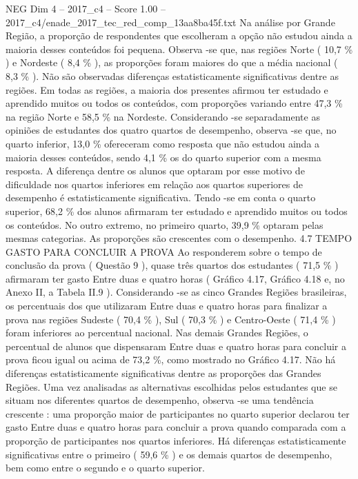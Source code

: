 \begin{textsample}{NEG Dim 4 – 2017\_c4 – Score 1.00 – 2017\_c4/enade\_2017\_tec\_red\_comp\_13aa8ba45f.txt}
Na análise por Grande Região, a proporção de respondentes que escolheram a opção não estudou ainda a maioria desses conteúdos foi pequena.
Observa -se que, nas regiões Norte ( 10,7 \% ) e Nordeste ( 8,4 \% ), as proporções foram maiores do que a média nacional ( 8,3 \% ).
Não são observadas diferenças estatisticamente significativas dentre as regiões.
Em todas as regiões, a maioria dos presentes afirmou ter estudado e aprendido muitos ou todos os conteúdos, com proporções variando entre 47,3 \% na região Norte e 58,5 \% na Nordeste.
Considerando -se separadamente as opiniões de estudantes dos quatro quartos de desempenho, observa -se que, no quarto inferior, 13,0 \% ofereceram como resposta que não estudou ainda a maioria desses conteúdos, sendo 4,1 \% os do quarto superior com a mesma resposta.
A diferença dentre os alunos que optaram por esse motivo de dificuldade nos quartos inferiores em relação aos quartos superiores de desempenho é estatisticamente significativa.
Tendo -se em conta o quarto superior, 68,2 \% dos alunos afirmaram ter estudado e aprendido muitos ou todos os conteúdos.
No outro extremo, no primeiro quarto, 39,9 \% optaram pelas mesmas categorias.
As proporções são crescentes com o desempenho. 4.7 TEMPO GASTO PARA CONCLUIR A PROVA Ao responderem sobre o tempo de conclusão da prova ( Questão 9 ), quase três quartos dos estudantes ( 71,5 \% ) afirmaram ter gasto Entre duas e quatro horas ( Gráfico 4.17, Gráfico 4.18 e, no Anexo II, a Tabela II.9 ).
Considerando -se as cinco Grandes Regiões brasileiras, os percentuais dos que utilizaram Entre duas e quatro horas para finalizar a prova nas regiões Sudeste ( 70,4 \% ), Sul ( 70,3 \% ) e Centro-Oeste ( 71,4 \% ) foram inferiores ao percentual nacional.
Nas demais Grandes Regiões, o percentual de alunos que dispensaram Entre duas e quatro horas para concluir a prova ficou igual ou acima de 73,2 \%, como mostrado no Gráfico 4.17.
Não há diferenças estatisticamente significativas dentre as proporções das Grandes Regiões.
Uma vez analisadas as alternativas escolhidas pelos estudantes que se situam nos diferentes quartos de desempenho, observa -se uma tendência crescente : uma proporção maior de participantes no quarto superior declarou ter gasto Entre duas e quatro horas para concluir a prova quando comparada com a proporção de participantes nos quartos inferiores.
Há diferenças estatisticamente significativas entre o primeiro ( 59,6 \% ) e os demais quartos de desempenho, bem como entre o segundo e o quarto superior.

\end{textsample}

